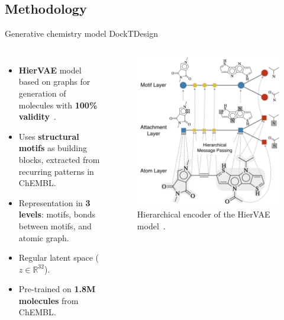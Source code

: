 \documentclass[aspectratio=169,xcolor=dvipsnames]{beamer}
\begin{document}
\subsection{Methodology}

\begin{frame}{Generative chemistry model \hfill {\footnotesize \alert{DockTDesign}}}
    \begin{columns}[t]
        \begin{itemize}
            \item \textbf{HierVAE} model based on graphs for generation of molecules with \textbf{100\% validity}~\cite{jin2020hierarchical}.
            \item Uses \textbf{structural motifs} as building blocks, extracted from recurring patterns in ChEMBL.
            \item Representation in \textbf{3 levels}: motifs, bonds between motifs, and atomic graph.
            \item Regular latent space ($z \in \mathbb{R}^{32}$).
            \item Pre-trained on \textbf{1.8M molecules} from ChEMBL.
        \end{itemize}

        \begin{figure}
            \centering
            \includegraphics[width=0.785\linewidth]{imgs/hiervae-encoder.png}
            \caption{Hierarchical encoder of the HierVAE model~\cite{jin2020hierarchical}.}
        \end{figure}
    \end{columns}
\end{frame}
\end{document}
